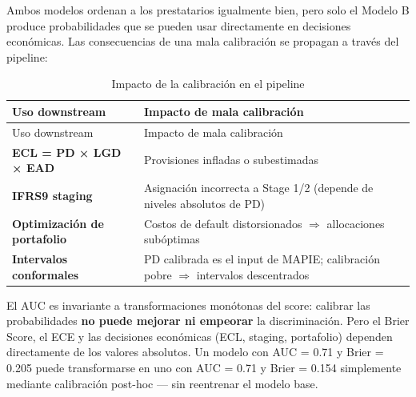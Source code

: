 \documentclass[
  spanish,
  11pt,
  letterpaper,
]{scrbook}
\theoremstyle{plain}
\theoremstyle{remark}
\begin{document}
Ambos modelos ordenan a los prestatarios igualmente bien, pero solo el
Modelo B produce probabilidades que se pueden usar directamente en
decisiones económicas. Las consecuencias de una mala calibración se
propagan a través del pipeline:

\begin{longtable}[]{@{}
  >{\raggedright\arraybackslash}p{}
  >{\raggedright\arraybackslash}p{}@{}}
\caption{Impacto de la calibración en el
pipeline}\label{tbl-calibration-impact}\tabularnewline
\toprule\noalign{}
\begin{minipage}[b]{\linewidth}\raggedright
Uso downstream
\end{minipage} & \begin{minipage}[b]{\linewidth}\raggedright
Impacto de mala calibración
\end{minipage} \\
\midrule\noalign{}
\endfirsthead
\toprule\noalign{}
\begin{minipage}[b]{\linewidth}\raggedright
Uso downstream
\end{minipage} & \begin{minipage}[b]{\linewidth}\raggedright
Impacto de mala calibración
\end{minipage} \\
\midrule\noalign{}
\endhead
\bottomrule\noalign{}
\endlastfoot
\textbf{ECL = PD × LGD × EAD} & Provisiones infladas o subestimadas \\
\textbf{IFRS9 staging} & Asignación incorrecta a Stage 1/2 (depende de
niveles absolutos de PD) \\
\textbf{Optimización de portafolio} & Costos de default distorsionados
\(\Rightarrow\) allocaciones subóptimas \\
\textbf{Intervalos conformales} & PD calibrada es el input de MAPIE;
calibración pobre \(\Rightarrow\) intervalos descentrados \\
\end{longtable}

\begin{tcolorbox}[enhanced jigsaw, arc=.35mm, bottomrule=.15mm, bottomtitle=1mm, breakable, colback=white, colbacktitle=quarto-callout-warning-color!10!white, colframe=quarto-callout-warning-color-frame, coltitle=black, left=2mm, leftrule=.75mm, opacityback=0, opacitybacktitle=0.6, rightrule=.15mm, title=\textcolor{quarto-callout-warning-color}{\faExclamationTriangle}\hspace{0.5em}{AUC invariante, ECL no}, titlerule=0mm, toprule=.15mm, toptitle=1mm]

El AUC es invariante a transformaciones monótonas del score: calibrar
las probabilidades \textbf{no puede mejorar ni empeorar} la
discriminación. Pero el Brier Score, el ECE y las decisiones económicas
(ECL, staging, portafolio) dependen directamente de los valores
absolutos. Un modelo con AUC = 0.71 y Brier = 0.205 puede transformarse
en uno con AUC = 0.71 y Brier = 0.154 simplemente mediante calibración
post-hoc --- sin reentrenar el modelo base.

\end{tcolorbox}
\end{document}
